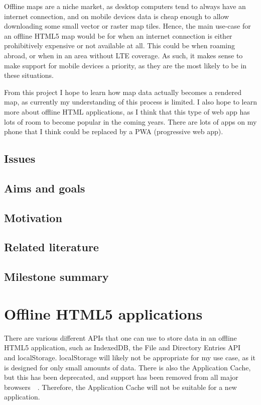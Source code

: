 \documentclass[]{final_report}
\begin{document}
Offline maps are a niche market, as desktop computers tend to always have an internet connection, and on mobile devices data is cheap enough to allow downloading some small vector or raster map tiles. Hence, the main use-case for an offline HTML5 map would be for when an internet connection is either prohibitively expensive or not available at all. This could be when roaming abroad, or when in an area without LTE coverage. As such, it makes sense to make support for mobile devices a priority, as they are the most likely to be in these situations.

From this project I hope to learn how map data actually becomes a rendered map, as currently my understanding of this process is limited. I also hope to learn more about offline HTML applications, as I think that this type of web app has lots of room to become popular in the coming years. There are lots of apps on my phone that I think could be replaced by a PWA (progressive web app).

\section{Issues}

\section{Aims and goals}

\section{Motivation}

\section{Related literature}

\section{Milestone summary}

\chapter{Offline HTML5 applications}

There are various different APIs that one can use to store data in an offline HTML5 application, such as IndexedDB, the File and Directory Entries API~\cite{w3c-file-directories-api}~\cite{mdn-file-directories-api} and localStorage. localStorage will likely not be appropriate for my use case, as it is designed for only small amounts of data. There is also the Application Cache, but this has been deprecated, and support has been removed from all major browsers~\cite{whatwg-application-cache}~\cite{mdn-application-cache}. Therefore, the Application Cache will not be suitable for a new application.
\end{document}
